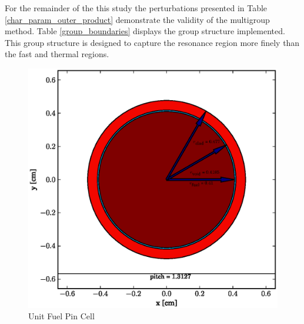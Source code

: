 For the remainder of the this study the perturbations presented in Table \ref{char_param_outer_product}
demonstrate the validity of the multigroup method.  Table \ref{group_boundaries} 
displays the group structure implemented.  This group structure is designed to capture the resonance 
region more finely than the fast and thermal regions.  

\begin{figure}[htbp]
\caption{Unit Fuel Pin Cell}
\label{fuel_pin_cell}
\begin{center}
\includegraphics[scale=0.5]{multigroup_method/figs/fuel_pin_cell.eps}
\end{center}
\end{figure}

